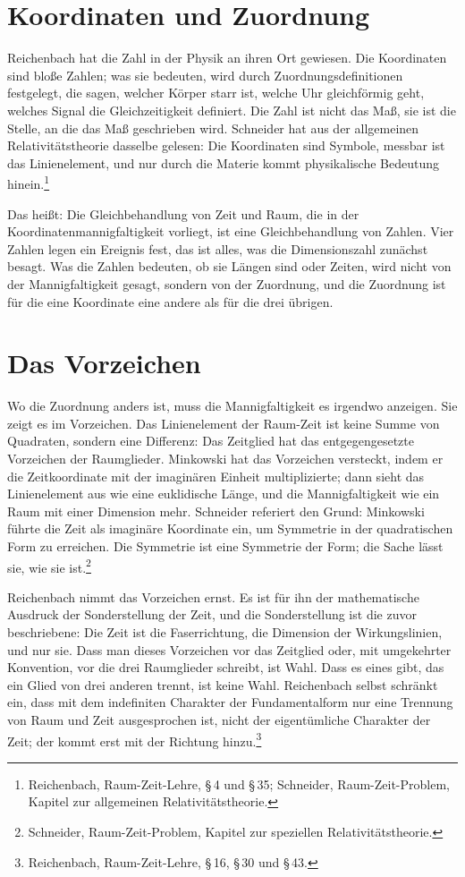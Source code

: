 \section{Koordinaten und Zuordnung}

Reichenbach hat die Zahl in der Physik an ihren Ort gewiesen. Die Koordinaten sind bloße Zahlen; was sie bedeuten, wird durch Zuordnungsdefinitionen festgelegt, die sagen, welcher Körper starr ist, welche Uhr gleichförmig geht, welches Signal die Gleichzeitigkeit definiert. Die Zahl ist nicht das Maß, sie ist die Stelle, an die das Maß geschrieben wird. Schneider hat aus der allgemeinen Relativitätstheorie dasselbe gelesen: Die Koordinaten sind Symbole, messbar ist das Linienelement, und nur durch die Materie kommt physikalische Bedeutung hinein.\footnote{Reichenbach, Raum-Zeit-Lehre, \S\,4 und \S\,35; Schneider, Raum-Zeit-Problem, Kapitel zur allgemeinen Relativitätstheorie.}

Das heißt: Die Gleichbehandlung von Zeit und Raum, die in der Koordinatenmannigfaltigkeit vorliegt, ist eine Gleichbehandlung von Zahlen. Vier Zahlen legen ein Ereignis fest, das ist alles, was die Dimensionszahl zunächst besagt. Was die Zahlen bedeuten, ob sie Längen sind oder Zeiten, wird nicht von der Mannigfaltigkeit gesagt, sondern von der Zuordnung, und die Zuordnung ist für die eine Koordinate eine andere als für die drei übrigen.

\section{Das Vorzeichen}

Wo die Zuordnung anders ist, muss die Mannigfaltigkeit es irgendwo anzeigen. Sie zeigt es im Vorzeichen. Das Linienelement der Raum-Zeit ist keine Summe von Quadraten, sondern eine Differenz: Das Zeitglied hat das entgegengesetzte Vorzeichen der Raumglieder. Minkowski hat das Vorzeichen versteckt, indem er die Zeitkoordinate mit der imaginären Einheit multiplizierte; dann sieht das Linienelement aus wie eine euklidische Länge, und die Mannigfaltigkeit wie ein Raum mit einer Dimension mehr. Schneider referiert den Grund: Minkowski führte die Zeit als imaginäre Koordinate ein, um Symmetrie in der quadratischen Form zu erreichen. Die Symmetrie ist eine Symmetrie der Form; die Sache lässt sie, wie sie ist.\footnote{Schneider, Raum-Zeit-Problem, Kapitel zur speziellen Relativitätstheorie.}

Reichenbach nimmt das Vorzeichen ernst. Es ist für ihn der mathematische Ausdruck der Sonderstellung der Zeit, und die Sonderstellung ist die zuvor beschriebene: Die Zeit ist die Faserrichtung, die Dimension der Wirkungslinien, und nur sie. Dass man dieses Vorzeichen vor das Zeitglied oder, mit umgekehrter Konvention, vor die drei Raumglieder schreibt, ist Wahl. Dass es eines gibt, das ein Glied von drei anderen trennt, ist keine Wahl. Reichenbach selbst schränkt ein, dass mit dem indefiniten Charakter der Fundamentalform nur eine Trennung von Raum und Zeit ausgesprochen ist, nicht der eigentümliche Charakter der Zeit; der kommt erst mit der Richtung hinzu.\footnote{Reichenbach, Raum-Zeit-Lehre, \S\,16, \S\,30 und \S\,43.}


